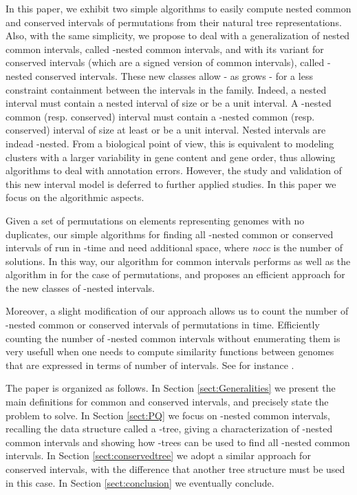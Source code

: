 \documentclass{article}
\begin{document}
In this paper, we exhibit two simple algorithms to easily compute
nested common and conserved intervals of  permutations from their
natural tree representations. Also, with the same simplicity, we
propose to deal with a generalization of nested common intervals,
called -nested common intervals, and with its variant for conserved
intervals (which are a signed version of common intervals), called
-nested conserved intervals.  These new classes allow - as 
grows - for a less constraint containment between the intervals in the
family. Indeed, a nested interval  must contain a nested interval
of size  or be a unit interval. A -nested common
(resp. conserved) interval must contain a -nested common
(resp. conserved) interval of size at least  or be a unit
interval. Nested intervals are indead -nested. 
From a biological point of view, this is equivalent to modeling
clusters with a larger variability in gene content and gene order,
thus allowing algorithms to deal with annotation errors. However, the
study and validation of this new interval model is deferred to
further applied studies. In this paper we focus on the algorithmic
aspects.

Given a set  of  permutations on  elements representing
genomes with no duplicates, our simple algorithms 
for finding all -nested common or conserved intervals of  run in
-time and need  additional space, where
\emph{nocc} is the number of solutions. In this way, our algorithm for 
common intervals performs as well as the algorithm in \citet{IR} for the case
of  permutations, and proposes an efficient approach for the new classes of 
-nested intervals.
 
Moreover, a slight modification of our approach allows us to count the number
of -nested common or conserved intervals  of  permutations in  time.
Efficiently counting the number of -nested common intervals without enumerating
them is very usefull when one needs to compute similarity functions between genomes that
are expressed in terms of number of intervals.  See for instance \citet{FR}.


The paper is organized as follows. In Section \ref{sect:Generalities}
we present the main definitions for common and conserved intervals, and
precisely state the problem to solve. In Section \ref{sect:PQ} we
focus on -nested common intervals, recalling the data structure called a 
-tree, giving a characterization of -nested common intervals and showing 
how -trees can be used to find all -nested common intervals. 
In Section \ref{sect:conservedtree} we adopt a similar approach for
conserved intervals, with the difference that another tree structure must
be  used in this case. In Section \ref{sect:conclusion} we eventually conclude.
\end{document}
